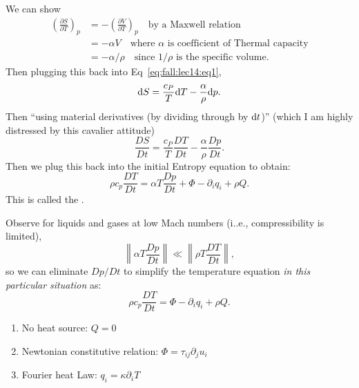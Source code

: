 \begin{node}
We can show
\begin{subequations}
  \begin{align}
\left(\frac{\partial S}{\partial T}\right)_{p}
&= - \left(\frac{\partial V}{\partial T}\right)_{p}\quad\mbox{by a Maxwell relation}\\
&= -\alpha V\quad\mbox{where $\alpha$ is coefficient of Thermal capacity}\\
&= -\alpha/\rho\quad\mbox{since $1/\rho$ is the specific volume}.
  \end{align}
\end{subequations}
Then plugging this back into Eq~\eqref{eq:fall:lec14:eq1},
\begin{equation}
\mathrm{d} S = \frac{c_{P}}{T}\mathrm{d} T-\frac{\alpha}{\rho}\mathrm{d} p.
\end{equation}
Then ``using material derivatives (by dividing through by $\mathrm{d} t$)''
(which I am highly distressed by this cavalier attitude)
\begin{equation}
\frac{D S}{D t} = \frac{c_{P}}{T}\frac{D T}{D t}-\frac{\alpha}{\rho}\frac{D p}{Dt}.
\end{equation}
Then we plug this back into the initial Entropy equation to obtain:
\begin{equation}
\boxed{\rho c_{p}\frac{DT}{Dt}=\alpha T\frac{Dp}{Dt}+\Phi-\partial_{i}q_{i}+\rho Q.}
\end{equation}
This is called the .
\end{node}

\begin{node}
Observe for liquids and gases at low Mach numbers (i..e.,
compressibility is limited),
\begin{equation}
\left\|\alpha T\frac{Dp}{Dt}\right\|\ll\left\|\rho T\frac{DT}{Dt}\right\|,
\end{equation}
so we can eliminate $Dp/Dt$ to simplify the temperature equation
\emph{in this particular situation} as:
\begin{equation}
\rho c_{p}\frac{DT}{Dt}=\Phi-\partial_{i}q_{i}+\rho Q.
\end{equation}
\end{node}

\begin{assume}[Temporarily]
\begin{enumerate}
\item No heat source: $Q=0$
\item Newtonian constitutive relation: $\Phi=\tau_{ij}\partial_{j}u_{i}$
\item Fourier heat Law: $q_{i}=\kappa\partial_{i}T$
\end{enumerate}
\end{assume}

